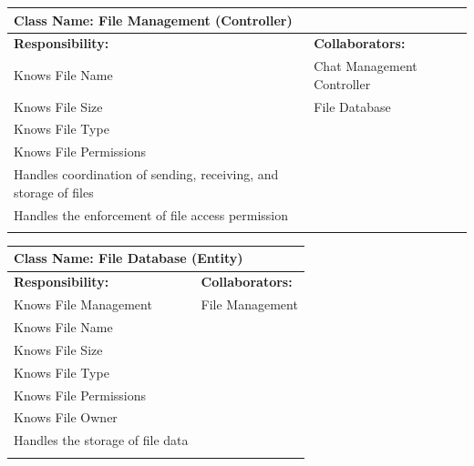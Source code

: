 \documentclass[]{article}
\begin{document}
\begin{itemize}
	\begin{table}[ht]
		\centering
		\begin{tabular}{|p{7cm}|p{7cm}|}
		\hline 
		 \multicolumn{2}{|l|}{\textbf{Class Name:} File Management (Controller)} \\
		\hline
		\textbf{Responsibility:} & \textbf{Collaborators:} \\
		\hline
			Knows File Name & Chat Management Controller\\
			Knows File Size & File Database\\
			Knows File Type &\\
			Knows File Permissions &\\
			Handles coordination of sending, receiving, and storage of files &\\
			Handles the enforcement of file access permission &\\
		\vspace{0.1in} & \\
		\hline
		\end{tabular}
	\end{table}


	\begin{table}[ht]
		\centering
		\begin{tabular}{|p{7cm}|p{7cm}|}
		\hline 
		 \multicolumn{2}{|l|}{\textbf{Class Name:} File Database (Entity)} \\
		\hline
		\textbf{Responsibility:} & \textbf{Collaborators:} \\
		\hline
			Knows File Management & File Management \\
			Knows File Name &\\
			Knows File Size &\\
			Knows File Type &\\
			Knows File Permissions &\\
			Knows File Owner &\\
			Handles the storage of file data &\\
		\vspace{0.1in} & \\
		\hline
		\end{tabular}
	\end{table}



\end{itemize}
\end{document}
